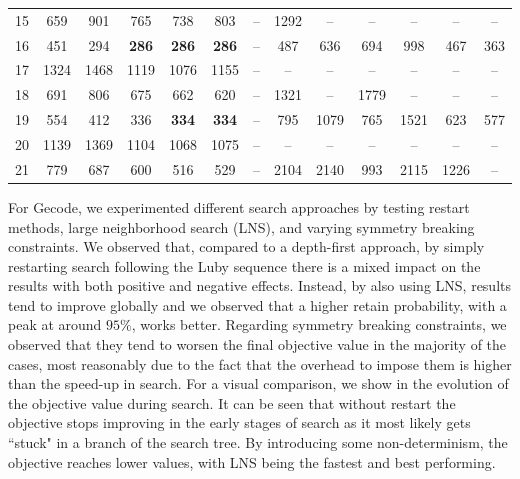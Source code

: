 \begin{table}[ht]
{\begin{tabular}{c|cccccccccccc}
            15 & 659            & 901           & 765           & 738           & 803           & --            & 1292          & --            & --            & --            & --            & --            \\ 
            16 & 451            & 294           & \textbf{286}  & \textbf{286}  & \textbf{286}  & --            & 487           & 636           & 694           & 998           & 467           & 363           \\ 
            17 & 1324           & 1468          & 1119          & 1076          & 1155          & --            & --            & --            & --            & --            & --            & --            \\ 
            18 & 691            & 806           & 675           & 662           & 620           & --            & 1321          & --            & 1779          & --            & --            & --            \\ 
            19 & 554            & 412           & 336           & \textbf{334}  & \textbf{334}  & --            & 795           & 1079          & 765           & 1521          & 623           & 577           \\ 
            20 & 1139           & 1369          & 1104          & 1068          & 1075          & --            & --            & --            & --            & --            & --            & --            \\ 
            21 & 779            & 687           & 600           & 516           & 529           & --            & 2104          & 2140          & 993           & 2115          & 1226          & --            \\ 
            \bottomrule
        \end{tabular}
    }
\end{table}

For Gecode, we experimented different search approaches by testing restart methods, large neighborhood search (LNS), and varying symmetry breaking constraints. We observed that, compared to a depth-first approach, by simply restarting search following the Luby sequence there is a mixed impact on the results with both positive and negative effects. Instead, by also using LNS, results tend to improve globally and we observed that a higher retain probability, with a peak at around $95\%$, works better. Regarding symmetry breaking constraints, we observed that they tend to worsen the final objective value in the majority of the cases, most reasonably due to the fact that the overhead to impose them is higher than the speed-up in search. For a visual comparison, we show in  the evolution of the objective value during search. It can be seen that without restart the objective stops improving in the early stages of search as it most likely gets ``stuck" in a branch of the search tree. By introducing some non-determinism, the objective reaches lower values, with LNS being the fastest and best performing.


